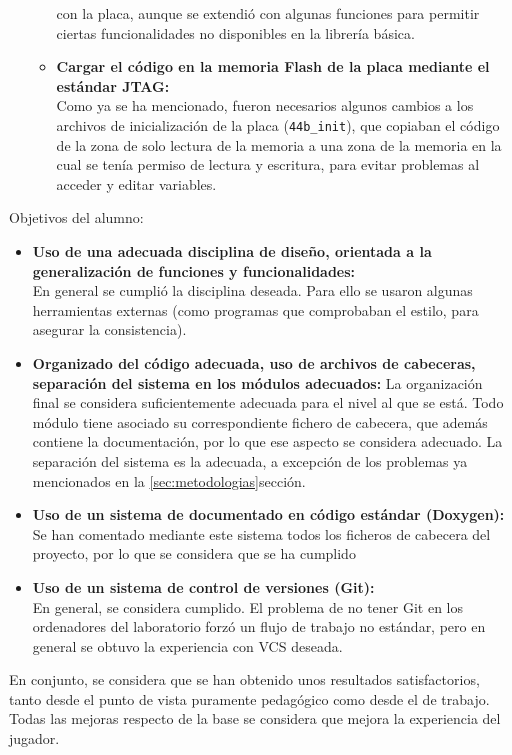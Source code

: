 \documentclass[12pt,letterpaper]{article}
\begin{document}
\begin{itemize}
\begin{itemize}
    con la placa, aunque se extendió con algunas funciones para
    permitir ciertas funcionalidades no disponibles en la librería
    básica.
  \item \textbf{Cargar el código en la memoria Flash de la placa
    mediante el estándar JTAG:}\\ Como ya se ha mencionado, fueron
    necesarios algunos cambios a los archivos de inicialización de la
    placa (\texttt{44b\_init}), que copiaban el código de la zona de
    solo lectura de la memoria a una zona de la memoria en la cual se
    tenía permiso de lectura y escritura, para evitar problemas al
    acceder y editar variables.
  \end{itemize}
\end{itemize}

Objetivos del alumno:
\begin{itemize}
\item \textbf{Uso de una adecuada disciplina de diseño, orientada a la
  generalización de funciones y funcionalidades:}\\ En general se
  cumplió la disciplina deseada. Para ello se usaron algunas
  herramientas externas (como programas que comprobaban el estilo,
  para asegurar la consistencia).
\item \textbf{Organizado del código adecuada, uso de archivos de
  cabeceras, separación del sistema en los módulos adecuados:} La
  organización final se considera suficientemente adecuada para el
  nivel al que se está. Todo módulo tiene asociado su correspondiente
  fichero de cabecera, que además contiene la documentación, por lo
  que ese aspecto se considera adecuado. La separación del sistema es
  la adecuada, a excepción de los problemas ya mencionados en la
  \ref{sec:metodologias}{sección}.
\item \textbf{Uso de un sistema de documentado en código estándar
  (Doxygen):}\\ Se han comentado mediante este sistema todos los
  ficheros de cabecera del proyecto, por lo que se considera que se ha
  cumplido
\item \textbf{Uso de un sistema de control de versiones (Git):}\\ En
  general, se considera cumplido. El problema de no tener Git en los
  ordenadores del laboratorio forzó un flujo de trabajo no estándar,
  pero en general se obtuvo la experiencia con VCS deseada.
\end{itemize}

En conjunto, se considera que se han obtenido unos resultados
satisfactorios, tanto desde el punto de vista puramente pedagógico
como desde el de trabajo. Todas las mejoras respecto de la base se
considera que mejora la experiencia del jugador.
\end{document}
